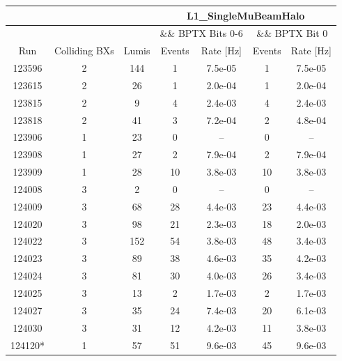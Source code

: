 \begin{table}[h]
\begin{center}
\begin{tabular}{|c|c|c|c|c|c|c|} \hline
        &       &       & \multicolumn{4}{|c|}{L1\_SingleMuBeamHalo} \\ \hline
        &       &       & \multicolumn{2}{|c|}{ \&\& BPTX Bits 0-6 }  & \multicolumn{2}{|c|}{\&\& BPTX Bit 0}      \\ \hline
 Run    & Colliding BXs & Lumis &  Events & Rate [Hz] &  Events & Rate [Hz] \\ \hline 
123596  &  2  & 144& 1   & 7.5e-05  & 1  & 7.5e-05 \\ \hline 
123615  &  2  & 26 & 1   & 2.0e-04  & 1  & 2.0e-04 \\ \hline 
123815  &  2  & 9  & 4   & 2.4e-03  & 4  & 2.4e-03 \\ \hline 
123818  &  2  & 41 & 3   & 7.2e-04  & 2  & 4.8e-04 \\ \hline 
123906  &  1  & 23 & 0   & --       & 0  & -- \\ \hline 
123908  &  1  & 27 & 2   & 7.9e-04  & 2  & 7.9e-04 \\ \hline 
123909  &  1  & 28 & 10  & 3.8e-03  & 10 & 3.8e-03 \\ \hline 
124008  &  3  & 2  & 0   & --       & 0  & -- \\ \hline 
124009  &  3  & 68 & 28  & 4.4e-03  & 23   & 4.4e-03 \\ \hline 
124020  &  3  & 98 & 21  & 2.3e-03  & 18   & 2.0e-03 \\ \hline 
124022  &  3  & 152& 54  & 3.8e-03  & 48   & 3.4e-03 \\ \hline 
124023  &  3  & 89 & 38  & 4.6e-03  & 35   & 4.2e-03 \\ \hline 
124024  &  3  & 81 & 30  & 4.0e-03  & 26   & 3.4e-03 \\ \hline 
124025  &  3  & 13 & 2   & 1.7e-03  &  2   & 1.7e-03 \\ \hline 
124027  &  3  & 35 & 24  & 7.4e-03  & 20   & 6.1e-03 \\ \hline 
124030  &  3  & 31 & 12  & 4.2e-03  & 11   & 3.8e-03 \\ \hline 
124120* &  1  & 57 & 51  & 9.6e-03  & 45   & 9.6e-03 \\ \hline 

\end{tabular}
\end{center}
\end{table}
